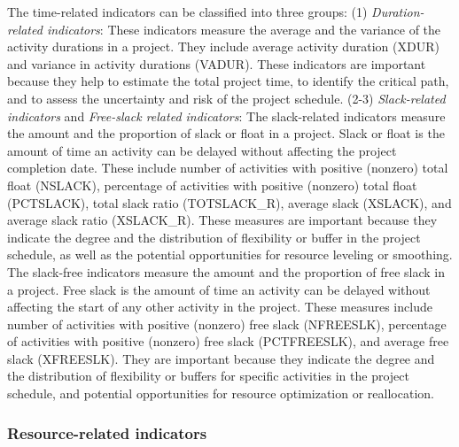 \documentclass[preprint,
3p]{elsarticle} %
\begin{document}
The time-related indicators can be classified into three groups: (1)
\emph{Duration-related indicators}: These indicators measure the average
and the variance of the activity durations in a project. They include
average activity duration (XDUR) and variance in activity durations
(VADUR). These indicators are important because they help to estimate
the total project time, to identify the critical path, and to assess the
uncertainty and risk of the project schedule. (2-3) \emph{Slack-related
indicators} and \emph{Free-slack related indicators}: The slack-related
indicators measure the amount and the proportion of slack or float in a
project. Slack or float is the amount of time an activity can be delayed
without affecting the project completion date. These include number of
activities with positive (nonzero) total float (NSLACK), percentage of
activities with positive (nonzero) total float (PCTSLACK), total slack
ratio (TOTSLACK\_R), average slack (XSLACK), and average slack ratio
(XSLACK\_R). These measures are important because they indicate the
degree and the distribution of flexibility or buffer in the project
schedule, as well as the potential opportunities for resource leveling
or smoothing. The slack-free indicators measure the amount and the
proportion of free slack in a project. Free slack is the amount of time
an activity can be delayed without affecting the start of any other
activity in the project. These measures include number of activities
with positive (nonzero) free slack (NFREESLK), percentage of activities
with positive (nonzero) free slack (PCTFREESLK), and average free slack
(XFREESLK). They are important because they indicate the degree and the
distribution of flexibility or buffers for specific activities in the
project schedule, and potential opportunities for resource optimization
or reallocation.

\subsubsection{Resource-related
indicators}\label{subsubsec:resindicators}
\end{document}
